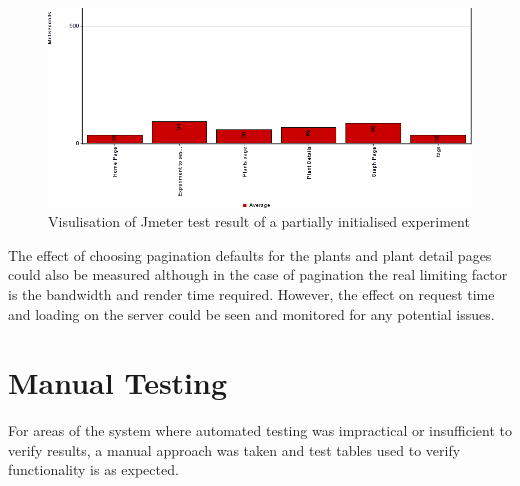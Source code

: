 \begin{figure}[H]
    \centering
    \includegraphics[width=\textwidth]{images/testing/jmeter_no_data_crop}
    \caption{Visulisation of Jmeter test result of a partially initialised experiment}
    \label{fig:jmeter_no_data}
\end{figure} 

The effect of choosing pagination defaults for the plants and plant detail pages could also be measured although in the case of pagination the real limiting factor is the bandwidth and render time required. However, the effect on request time and loading on the server could be seen and monitored for any potential issues.



\section{Manual Testing}
For areas of the system where automated testing was impractical or insufficient to verify results, a manual approach was taken and test tables used to verify functionality is as expected. 


